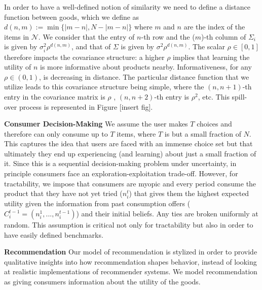 \documentclass[sigconf]{acmart}
\begin{document}
In order to have a well-defined notion of similarity we need to define a distance function between goods, which we define as $d(n,m):=\min\{ \lvert m - n \rvert ,N - \lvert m - n \rvert \}$ where $m$ and $n$ are the index of the items in $\mathcal{N}$. We consider that the entry of $n$-th row and the ($m$)-th column of $\Sigma_i$ is given by $\sigma_i^2 \rho^{d(n,m)}$, and that of $\Sigma$ is given by $\sigma^2 \rho^{d(n,m)}$. The scalar $\rho \in [0,1]$ therefore impacts the covariance structure: a higher $\rho$ implies that learning the utility of $n$ is more informative about products nearby. Informativeness, for any $\rho \in (0,1)$, is decreasing in distance. The particular distance function that we utilize leads to this covariance structure being simple, where the $(n,n+1)$-th entry in the covariance matrix is $\rho$ , $(n,n+2)$-th entry is $\rho^2$, etc. This spill-over process is represented in Figure [insert fig].
\par
\textbf{Consumer Decision-Making}
We assume the user makes $T$ choices and therefore can only consume up to $T$ items, where $T$ is but a small fraction of $N$. This captures the idea that users are faced with an immense choice set but that ultimately they end up experiencing (and learning) about just a small fraction of it. Since this is a sequential decision-making problem under uncertainty, in principle consumers face an exploration-exploitation trade-off. However, for tractability, we impose that consumers are myopic and every period consume the product that they have not yet tried ($n_i^t$) that gives them the highest expected utility given the information from past consumption offers ($C_i^{t-1}=(n_i^1,...,n_i^{t-1})$) and their initial beliefs. Any ties are broken uniformly at random. This assumption is critical not only for tractability but also in order to have easily defined benchmarks.
\par
\noindent \textbf{Recommendation}
Our model of recommendation is stylized in order to provide qualitative insights into how recommendation shapes behavior, instead of looking at realistic implementations of recommender systems. We model recommendation as giving consumers information about the utility of the goods.
\end{document}
